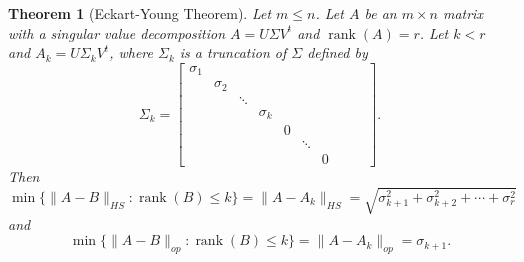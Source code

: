 \documentclass[12pt,letterpaper]{book}
\numberwithin{equation}{section}
\newtheorem{thm}{\textbf{Theorem}}[section]
\theoremstyle{definition}
\newcommand{\rank}{\operatorname{rank}}
\begin{document}
\begin{thm}[Eckart-Young Theorem] \label{EckartYoung}
Let $m\leq n$. Let $A$ be an $m\times n$ matrix with a singular value decomposition $A=U\Sigma V^t$ and $\rank(A)=r$. Let $k< r$ and $A_k=U\Sigma_k V^t$, where $\Sigma_k$ is a truncation of $\Sigma$ defined by
$$\Sigma_{k}=\left[\begin{array}{cccccccccc} \sigma_1 & & & && &&&& \\ & \sigma_2 & &&&&&&& \\ & & \ddots &&&&&& \\ & & & \sigma_k&&&&&& \\ &&&& 0 &&&&& \\ &&&&&\ddots &&&& \\ &&&&&& 0 &&& \end{array}\right].$$
Then
$$\min\{\|A-B\|_{HS}:  \rank (B) \leq k\}=\|A-A_k\|_{HS}=\sqrt{\sigma_{k+1}^2+\sigma_{k+2}^2+\cdots+\sigma_{r}^2}$$
and
$$\min\{\|A-B\|_{op}: \rank (B) \leq k \}=\|A-A_k\|_{op}=\sigma_{k+1}.$$
\end{thm}
\end{document}
